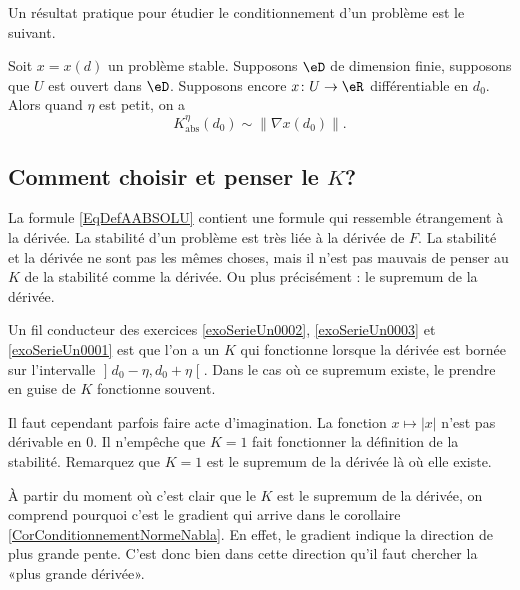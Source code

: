 Un résultat pratique pour étudier le conditionnement d'un problème est le suivant.
\begin{corollary}		\label{CorConditionnementNormeNabla}
	Soit $x=x(d)$ un problème stable. Supposons $\eD$ de dimension finie, supposons que $U$ est ouvert dans $\eD$. Supposons encore $x\colon U\to \eR$ différentiable en $d_0$. Alors quand $\eta$ est petit, on a
	\begin{equation}
		K_{\text{abs}}^{\eta}(d_0)\sim \| \nabla x(d_0) \|.
	\end{equation}
\end{corollary}

\subsection{Comment choisir et penser le $K$?}

La formule \eqref{EqDefAABSOLU} contient une formule qui ressemble étrangement à la dérivée. La stabilité d'un problème est très liée à la dérivée de $F$. La stabilité et la dérivée ne sont pas les mêmes choses, mais il n'est pas mauvais de penser au $K$ de la stabilité comme la dérivée. Ou plus précisément : le supremum de la dérivée.

Un fil conducteur des exercices \ref{exoSerieUn0002}, \ref{exoSerieUn0003} et \ref{exoSerieUn0001} est que l'on a un $K$ qui fonctionne lorsque la dérivée est bornée sur l'intervalle $\mathopen] d_0-\eta , d_0+\eta \mathclose[$. Dans le cas où ce supremum existe, le prendre en guise de $K$ fonctionne souvent.

Il faut cependant parfois faire acte d'imagination. La fonction $x\mapsto| x |$ n'est pas dérivable en $0$. Il n'empêche que $K=1$ fait fonctionner la définition de la stabilité. Remarquez que $K=1$ est le supremum de la dérivée là où elle existe.

À partir du moment où c'est clair que le $K$ est le supremum de la dérivée, on comprend pourquoi c'est le gradient qui arrive dans le corollaire \ref{CorConditionnementNormeNabla}. En effet, le gradient indique la direction de plus grande pente. C'est donc bien dans cette direction qu'il faut chercher la «plus grande dérivée».

